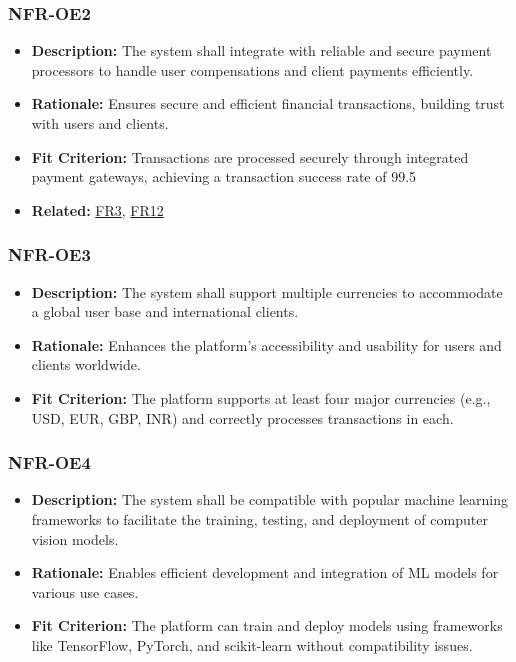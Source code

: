 \documentclass[12pt]{article}
\begin{document}
\subsubsection*{NFR-OE2}
\label{sec:OE2}
\begin{itemize}
  \item \textbf{Description:} The system shall integrate with reliable and secure payment processors to handle user compensations and client payments efficiently.
  \item \textbf{Rationale:} Ensures secure and efficient financial transactions, building trust with users and clients.
  \item \textbf{Fit Criterion:} Transactions are processed securely through integrated payment gateways, achieving a transaction success rate of 99.5%
  \item \textbf{Related:} \hyperref[sec:FR3]{FR3}, \hyperref[sec:FR12]{FR12}
\end{itemize}
\subsubsection*{NFR-OE3}
\label{sec:OE3}
\begin{itemize}
  \item \textbf{Description:} The system shall support multiple currencies to accommodate a global user base and international clients.
  \item \textbf{Rationale:} Enhances the platform’s accessibility and usability for users and clients worldwide.
  \item \textbf{Fit Criterion:} The platform supports at least four major currencies (e.g., USD, EUR, GBP, INR) and correctly processes transactions in each.
\end{itemize}
\subsubsection*{NFR-OE4}
\label{sec:OE4}
\begin{itemize}
  \item \textbf{Description:} The system shall be compatible with popular machine learning frameworks to facilitate the training, testing, and deployment of computer vision models.
  \item \textbf{Rationale:} Enables efficient development and integration of ML models for various use cases.
  \item \textbf{Fit Criterion:} The platform can train and deploy models using frameworks like TensorFlow, PyTorch, and scikit-learn without compatibility issues.
\end{itemize}
\end{document}
